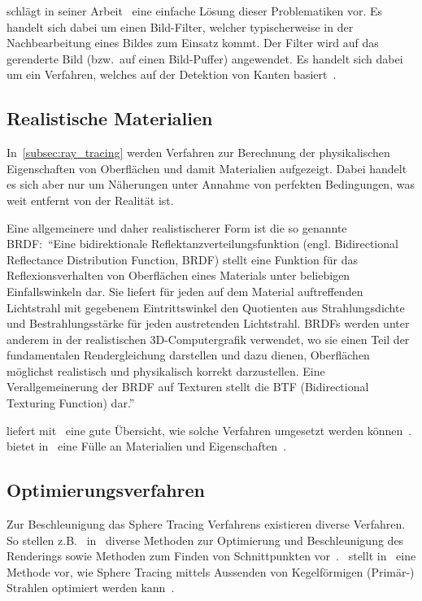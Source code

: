 \citeauthor{lottes_fxaa_2009} schlägt in seiner
Arbeit~ eine einfache Lösung dieser
Problematiken vor. Es handelt sich dabei um einen Bild-Filter, welcher
typischerweise in der Nachbearbeitung eines Bildes zum Einsatz kommt.
Der Filter wird auf das gerenderte Bild (bzw.\ auf einen Bild-Puffer)
angewendet. Es handelt sich dabei um ein Verfahren, welches auf der
Detektion von Kanten basiert~\parencite{lottes_fxaa_2009}.

\subsection{Realistische Materialien}
\label{subsec:further_work:brdf}

In~\autoref{subsec:ray_tracing} werden Verfahren zur Berechnung der
physikalischen Eigenschaften von Oberflächen und damit Materialien
aufgezeigt. Dabei handelt es sich aber nur um Näherungen unter Annahme
von perfekten Bedingungen, was weit entfernt von der Realität ist.

Eine allgemeinere und daher realistischerer Form ist die so genannte
BRDF:\ ``Eine bidirektionale Reflektanzverteilungsfunktion (engl.
Bidirectional Reflectance Distribution Function, BRDF) stellt eine
Funktion für das Reflexionsverhalten von Oberflächen eines Materials
unter beliebigen Einfallswinkeln dar. Sie liefert für jeden auf dem
Material auftreffenden Lichtstrahl mit gegebenem Eintrittswinkel den
Quotienten aus Strahlungsdichte und Bestrahlungsstärke für jeden
austretenden Lichtstrahl. BRDFs werden unter anderem in der
realistischen 3D-Computergrafik verwendet, wo sie einen Teil der
fundamentalen Rendergleichung darstellen und dazu dienen, Oberflächen
möglichst realistisch und physikalisch korrekt darzustellen. Eine
Verallgemeinerung der BRDF auf Texturen stellt die BTF (Bidirectional
Texturing Function)
dar.''~\parencite{wikipedia_the_free_encyclopedia_bidirektionale_2014}

\citeauthor{burley_physicall-based_2012} liefert
mit~ eine gute Übersicht,
wie solche Verfahren umgesetzt werden
können~\parencite{burley_physicall-based_2012}.
\citeauthor{bagher_accurate_2012} bietet
in~ eine Fülle an Materialien und
Eigenschaften~\parencite{bagher_accurate_2012}.

\subsection{Optimierungsverfahren}
\label{subsec:further_work:optimisation}

Zur Beschleunigung das Sphere Tracing Verfahrens existieren diverse
Verfahren. So stellen z.B.~\citeauthor{keinert_enhanced_2014}
in~ diverse Methoden zur
Optimierung und Beschleunigung des Renderings sowie Methoden zum Finden
von Schnittpunkten vor~\parencite{keinert_enhanced_2014}.~\citeauthor{seven_rendering_2012} stellt
in~ eine Methode vor, wie Sphere Tracing
mittels Aussenden von Kegelförmigen (Primär-) Strahlen optimiert werden
kann~\parencite{seven_rendering_2012}.
